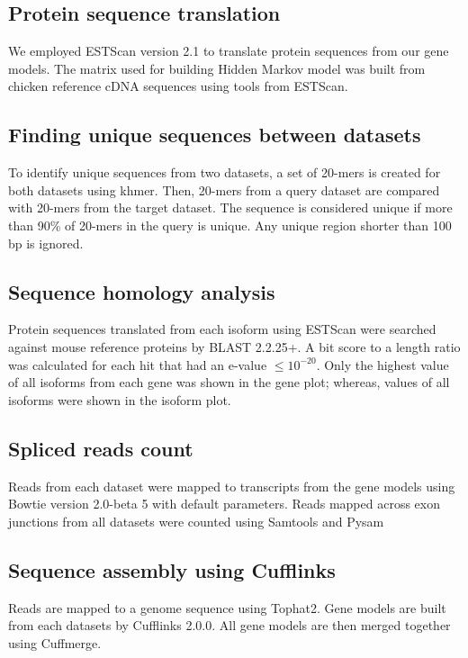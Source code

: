 \documentclass[10pt]{article}
\begin{document}
\subsection*{Protein sequence translation}

We employed ESTScan version 2.1 to translate protein sequences from our gene models.
The matrix used for building Hidden Markov model was built from chicken reference cDNA sequences using tools from ESTScan.

\subsection*{Finding unique sequences between datasets}

To identify unique sequences from two datasets, a set of 20-mers is created for both datasets using
khmer\cite{khmer}.
Then, 20-mers from a query dataset are compared with 20-mers from the target dataset.
The sequence is considered unique if more than 90\% of 20-mers in the query is unique.
Any unique region shorter than 100 bp is ignored.

\subsection*{Sequence homology analysis}

Protein sequences translated from each isoform using ESTScan were searched against mouse reference proteins by BLAST 2.2.25+\cite{Tatusova:1999tz}.
A bit score to a length ratio was calculated for each hit that had an e-value $\le 10^{-20}$.
Only the highest value of all isoforms from each gene was shown in the gene plot; whereas, values of all isoforms were shown in the isoform plot.

\subsection*{Spliced reads count}

Reads from each dataset were mapped to transcripts from the gene models using Bowtie version 2.0-beta 5 with default parameters.
Reads mapped across exon junctions from all datasets were counted using Samtools\cite{Li:2009vz} and
Pysam\cite{pysam}

\subsection*{Sequence assembly using Cufflinks}
Reads are mapped to a genome sequence using Tophat2.
Gene models are built from each datasets by Cufflinks 2.0.0\cite{Trapnell:2010kd}.
All gene models are then merged together using Cuffmerge.
\end{document}
